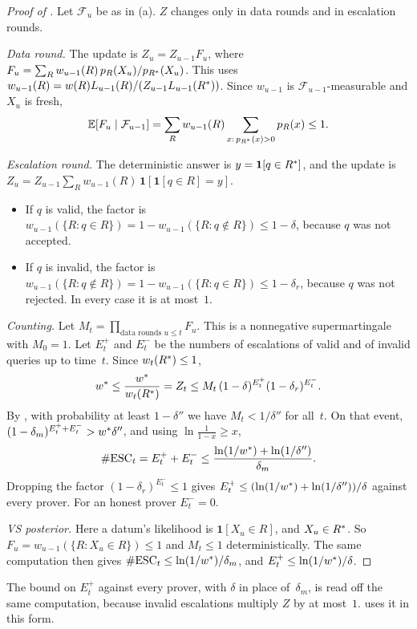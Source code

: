 \begin{proof}[Proof of ]
Let $\mathcal F_u$ be as in (a). $Z$ changes only in data rounds and in escalation rounds.

\emph{Data round.} The update is $Z_u=Z_{u-1}F_u$, where $F_u=\sum_Rw_{u-1}(R)\,p_R(X_u)/p_{R^{*}}(X_u)$. This uses $w_{u-1}(R)=w(R)L_{u-1}(R)/(Z_{u-1}L_{u-1}(R^{*}))$. Since $w_{u-1}$ is $\mathcal F_{u-1}$-measurable and $X_u$ is fresh,
\[
\mathbb{E}[F_u\mid\mathcal F_{u-1}]=\sum_Rw_{u-1}(R)\sum_{x:\,p_{R^{*}}(x)>0}p_R(x)\le1 .
\]

\emph{Escalation round.} The deterministic answer is $y=\mathbf 1[q\in R^{*}]$, and the update is $Z_u=Z_{u-1}\sum_Rw_{u-1}(R)\,\mathbf 1[\mathbf 1[q\in R]=y]$.
\begin{itemize}
\item If $q$ is valid, the factor is $w_{u-1}(\{R:q\in R\})=1-w_{u-1}(\{R:q\notin R\})\le1-\delta$, because $q$ was not accepted.
\item If $q$ is invalid, the factor is $w_{u-1}(\{R:q\notin R\})=1-w_{u-1}(\{R:q\in R\})\le1-\delta_r$, because $q$ was not rejected. In every case it is at most~$1$.
\end{itemize}

\emph{Counting.} Let $M_t=\prod_{\text{data rounds }u\le t}F_u$. This is a nonnegative supermartingale with $M_0=1$. Let $E^+_t$ and $E^-_t$ be the numbers of escalations of valid and of invalid queries up to time~$t$. Since $w_t(R^{*})\le1$,
\[
w^{*}\le\frac{w^{*}}{w_t(R^{*})}=Z_t\le M_t\,(1-\delta)^{E^+_t}(1-\delta_r)^{E^-_t}.
\]
By , with probability at least $1-\delta''$ we have $M_t<1/\delta''$ for all~$t$. On that event, $(1-\delta_m)^{E^+_t+E^-_t}>w^{*}\delta''$, and using $\ln\frac1{1-x}\ge x$,
\[
\#\mathrm{ESC}_t=E^+_t+E^-_t\le\frac{\ln(1/w^{*})+\ln(1/\delta'')}{\delta_m}.
\]
Dropping the factor $(1-\delta_r)^{E^-_t}\le1$ gives $E^+_t\le(\ln(1/w^{*})+\ln(1/\delta''))/\delta$ against every prover. For an honest prover $E^-_t=0$.

\emph{VS posterior.} Here a datum's likelihood is $\mathbf 1[X_u\in R]$, and $X_u\in R^{*}$. So $F_u=w_{u-1}(\{R:X_u\in R\})\le1$ and $M_t\le1$ deterministically. The same computation then gives $\#\mathrm{ESC}_t\le\ln(1/w^{*})/\delta_m$, and $E^+_t\le\ln(1/w^{*})/\delta$.
\end{proof}

The bound on $E^+_t$ against every prover, with $\delta$ in place of~$\delta_m$, is read off the same computation, because invalid escalations multiply $Z$ by at most~$1$.  uses it in this form.

